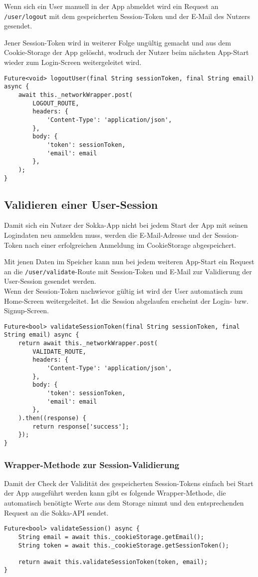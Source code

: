 Wenn sich ein User manuell in der App abmeldet wird ein Request an \lstinline{/user/logout} mit
dem gespeicherten Session-Token und der E-Mail des Nutzers gesendet.

Jener Session-Token wird in weiterer Folge ungültig gemacht und aus dem Cookie-Storage der App
gelöscht, wodruch der Nutzer beim nächsten App-Start wieder zum Login-Screen weitergeleitet wird.

\begin{lstlisting}
Future<void> logoutUser(final String sessionToken, final String email) async {
    await this._networkWrapper.post(
        LOGOUT_ROUTE,
        headers: {
            'Content-Type': 'application/json',
        },
        body: {
            'token': sessionToken,
            'email': email
        },
    );
}
\end{lstlisting}

\subsection{Validieren einer User-Session}

Damit sich ein Nutzer der Sokka-App nicht bei jedem Start der App mit seinen Logindaten neu
anmelden muss, werden die E-Mail-Adresse und der Session-Token nach einer erfolgreichen Anmeldung
im CookieStorage abgespeichert.

Mit jenen Daten im Speicher kann nun bei jedem weiteren App-Start ein Request an die
\lstinline{/user/validate}-Route mit Session-Token und E-Mail zur Validierung der User-Session
gesendet werden.\\
Wenn der Session-Token nachwievor gültig ist wird der User automatisch zum Home-Screen weitergeleitet.
Ist die Session abgelaufen erscheint der Login- bzw. Signup-Screen.

\begin{lstlisting}
Future<bool> validateSessionToken(final String sessionToken, final String email) async {
    return await this._networkWrapper.post(
        VALIDATE_ROUTE,
        headers: {
            'Content-Type': 'application/json',
        },
        body: {
            'token': sessionToken,
            'email': email
        },
    ).then((response) {
        return response['success'];
    });
}
\end{lstlisting}

\subsubsection{Wrapper-Methode zur Session-Validierung}

Damit der Check der Validität des gespeicherten Session-Tokens einfach
bei Start der App ausgeführt werden kann gibt es folgende Wrapper-Methode,
die automatisch benötigte Werte aus dem Storage nimmt und den entsprechenden
Request an die Sokka-API sendet.

\begin{lstlisting}
Future<bool> validateSession() async {
    String email = await this._cookieStorage.getEmail();
    String token = await this._cookieStorage.getSessionToken();

    return await this.validateSessionToken(token, email);
}
\end{lstlisting}